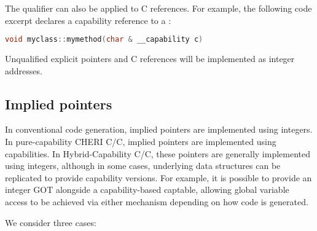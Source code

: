 \documentclass[12pt,twoside,openright,a4paper]{article}
\newcommand{\ccode}[1]{{\small\ttfamily{#1}}}
\newcommand{\uucap}{{\ccode{\_\_capability}}\xspace}
\newcommand*{\cpp}{\texorpdfstring{C\textsmaller[2]{\protect\nolinebreak[4]\hspace{-.05em}\raisebox{.45ex}{\textbf{++}}}}{C++}}
\newcommand*{\COrCpp}{C/\cpp{}}
\newcommand*{\purecapCOrCpp}{CHERI \COrCpp{}}
\newcommand*{\hybridCOrCpp}{Hybrid-Capability \COrCpp{}}
\begin{document}
\noindent
The \uucap qualifier can also be applied to \cpp{} references.
For example, the following code excerpt declares a capability reference to a
\ccode{char}:

\begin{lstlisting}[language=C]
void myclass::mymethod(char & __capability c)
\end{lstlisting}

\noindent
Unqualified explicit pointers and \cpp{} references will be implemented as
integer addresses.

\subsection{Implied pointers}

In conventional code generation, implied pointers are implemented using
integers.
In pure-capability \purecapCOrCpp{}, implied pointers  are implemented using
capabilities.
In \hybridCOrCpp{}, these pointers are generally implemented using integers,
although in some cases, underlying data structures can be replicated to
provide capability versions.
For example, it is possible to provide an integer GOT alongside a
capability-based captable, allowing global variable access to be achieved
via either mechanism depending on how code is generated.

We consider three cases:
\end{document}
